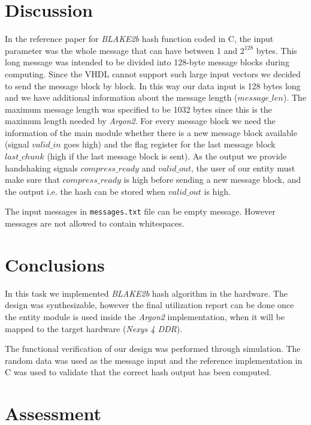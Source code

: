 \documentclass[%
	a4paper,
]
{article}
\begin{document}
\section{Discussion}
\label{sec:discussion}
In the reference paper \autocite{rfc7693} for \emph{BLAKE2b} hash function coded in C, the input parameter was the whole message that can have between 1 and $2^{128}$ bytes. This long message was intended to be divided into 128-byte message blocks during computing. Since the VHDL cannot support such large input vectors we decided to send the message block by block. In this way our data input is 128 bytes long and we have additional information about the message length ($message\_len$). The maximum message length was specified to be 1032 bytes since this is the maximum length needed by \emph{Argon2}. For every message block we need the information of the main module whether there is a new message block available (signal $valid\_in$ goes high) and the flag register for the last message block $last\_chunk$ (high if the last message block is sent). As the output we provide handshaking signals $compress\_ready$ and $valid\_out$, the user of our entity must make sure that $compress\_ready$ is high before sending a new message block, and the output i.e. the hash can be stored when $valid\_out$ is high.

The input messages in \texttt{messages.txt} file can be empty message. However messages are not allowed to contain whitespaces.
%
\section{Conclusions}
\label{sec:conclusions}

In this task we implemented \emph{BLAKE2b} hash algorithm in the hardware. The design was synthesizable, however the final utilization report can be done once the entity module is used inside the \emph{Argon2} implementation, when it will be mapped to the target hardware (\emph{Nexys 4 DDR}). 

The functional verification of our design was performed through simulation. The random data was used as the message input and the reference implementation in C was used to validate that the correct hash output has been computed.
%
%
\pagebreak
\section{Assessment}
\label{sec:assessment}
\end{document}
